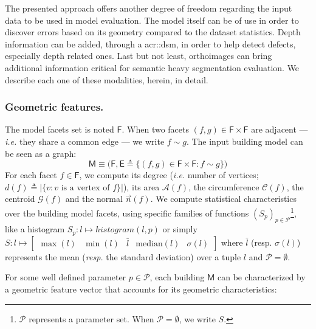 \documentclass[runningheads]{llncs}
\begin{document}
The presented approach offers another degree of freedom regarding the input data to be used in model evaluation. The model itself can be of use in order to discover errors based on its geometry compared to the dataset statistics. Depth information can be added, through a \acrshort{acr::dsm}, in order to help detect defects, especially depth related ones. Last but not least, orthoimages can bring additional information critical for semantic heavy segmentation evaluation. We describe each one of these modalities, herein, in detail.

\subsubsection{Geometric features.}
The model facets set is noted $\mathsf{F}$. When two facets $(f, g) \in \mathsf{F} \times \mathsf{F}$ are adjacent --- \textit{i.e.} they share a common edge --- we write $f \sim g$. The input building model can be seen as a graph:
\begin{equation}
	\label{eq::model_graph}
	\mathsf{M} \equiv \Big(\mathsf{F}, \mathsf{E} \triangleq \big\{ (f, g) \in \mathsf{F} \times \mathsf{F} : f \sim g \big\} \Big)
\end{equation}
For each facet $f \in \mathsf{F}$, we compute its degree (\textit{i.e.} number of vertices; $d(f) \triangleq \vert\{v : v\text{ is a vertex of }f\}\vert$), its area $\mathscr{A}(f)$, the circumference $\mathscr{C}(f)$, the centroid $\mathscr{G}(f)$ and the normal $\vec{n}(f)$. We compute statistical characteristics over the building model facets, using specific families of functions $(S_p)_{p \in \mathscr{P}}$\footnote{$\mathscr{P}$ represents a parameter set. When  $\mathscr{P}=\emptyset$, we write $S$.}, like a histogram $S_{p}: l \mapsto histogram(l, p)$ or simply $S: l \mapsto \begin{bmatrix}
\max(l)& \min(l) & \bar{l} & \text{median}(l) & \sigma(l)
\end{bmatrix}$ where $\bar{l}$ (resp. $\sigma(l)$) represents the mean (\textit{resp.} the standard deviation) over a tuple $l$ and $\mathscr{P}=\emptyset$.

 For some well defined parameter $p \in \mathscr{P}$, each building $\mathsf{M}$ can be characterized by a geometric feature vector that accounts for its geometric characteristics:
\end{document}
